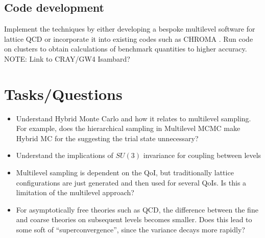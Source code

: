 \documentclass[11pt]{article}
\newcommand{\cblue}[1]{{\color{blue}#1}}
\newcommand{\note}[1]{\cblue{NOTE: #1}}
\begin{document}
\subsection{Code development}
Implement the techniques by either developing a bespoke multilevel software for lattice QCD or incorporate it into existing codes such as CHROMA \cite{Edwards2005}. Run code on clusters to obtain calculations of benchmark quantities to higher accuracy. \note{Link to CRAY/GW4 Isambard?}
\section{Tasks/Questions}
\begin{itemize}
  \item Understand Hybrid Monte Carlo and how it relates to multilevel sampling. For example, does the hierarchical sampling in Multilevel MCMC make Hybrid MC for the suggesting the trial state unnecessary?
  \item Understand the implications of $SU(3)$ invariance for coupling between levels
  \item Multilevel sampling is dependent on the QoI, but traditionally lattice configurations are just generated and then used for several QoIs. Is this a limitation of the multilevel approach?
\item For asymptotically free theories such as QCD, the difference between the fine and coarse theories on subsequent levels becomes smaller. Does this lead to some soft of ``superconvergence'', since the variance decays more rapidly?
\end{itemize}
\appendix
\end{document}
